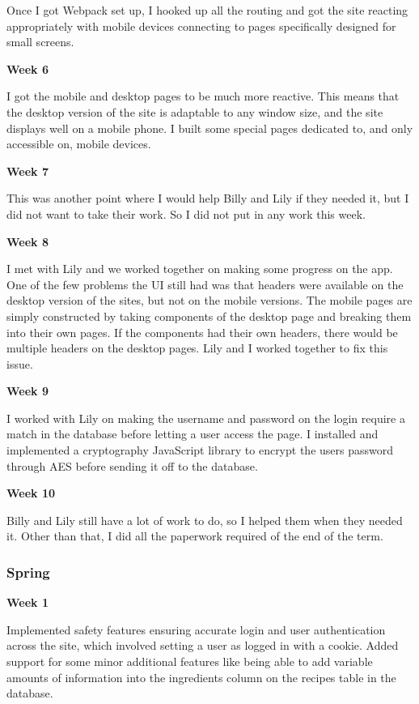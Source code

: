 Once I got Webpack set up, I hooked up all the routing and got the site reacting appropriately with mobile devices connecting to pages specifically designed for small screens.


\noindent\medskip\textbf{Week 6}

I got the mobile and desktop pages to be much more reactive.
This means that the desktop version of the site is adaptable to any window size, and the site displays well on a mobile phone.
I built some special pages dedicated to, and only accessible on, mobile devices.

\noindent\medskip\textbf{Week 7}

This was another point where I would help Billy and Lily if they needed it, but I did not want to take their work.
So I did not put in any work this week.

\noindent\medskip\textbf{Week 8}

I met with Lily and we worked together on making some progress on the app.
One of the few problems the UI still had was that headers were available on the desktop version of the sites, but not on the mobile versions.
The mobile pages are simply constructed by taking components of the desktop page and breaking them into their own pages.
If the components had their own headers, there would be multiple headers on the desktop pages.
Lily and I worked together to fix this issue.

\noindent\medskip\textbf{Week 9}

I worked with Lily on making the username and password on the login require a match in the database before letting a user access the page.
I installed and implemented a cryptography JavaScript library to encrypt the users password through AES before sending it off to the database.

\noindent\medskip\textbf{Week 10}

Billy and Lily still have a lot of work to do, so I helped them when they needed it.
Other than that, I did all the paperwork required of the end of the term.

\subsubsection{Spring}
\hfill\break
\noindent\medskip\textbf{Week 1}

Implemented safety features ensuring accurate login and user authentication across the site, which involved setting a user as logged in with a cookie.
Added support for some minor additional features like being able to add variable amounts of information into the ingredients column on the recipes table in the database.

